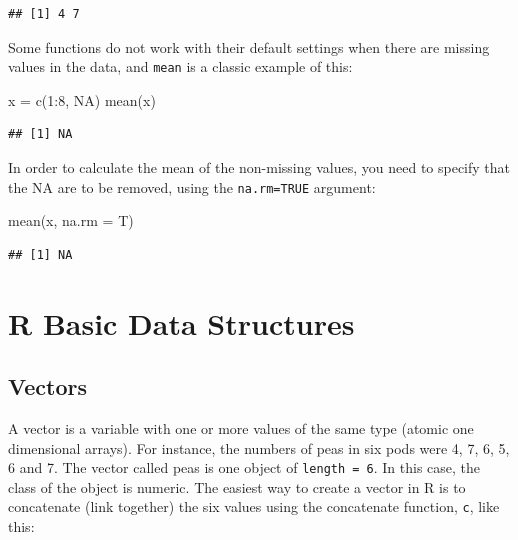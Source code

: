 \documentclass[
]{book}
\newenvironment{Shaded}{\begin{snugshade}}{\end{snugshade}}
\newcommand{\AttributeTok}[1]{\textcolor[rgb]{0.77,0.63,0.00}{#1}}
\newcommand{\ConstantTok}[1]{\textcolor[rgb]{0.00,0.00,0.00}{#1}}
\newcommand{\DecValTok}[1]{\textcolor[rgb]{0.00,0.00,0.81}{#1}}
\newcommand{\FunctionTok}[1]{\textcolor[rgb]{0.00,0.00,0.00}{#1}}
\newcommand{\NormalTok}[1]{#1}
\newcommand{\OtherTok}[1]{\textcolor[rgb]{0.56,0.35,0.01}{#1}}
\newcommand{\SpecialCharTok}[1]{\textcolor[rgb]{0.00,0.00,0.00}{#1}}
\begin{document}
\begin{verbatim}
## [1] 4 7
\end{verbatim}

Some functions do not work with their default settings when there are missing values in the data, and \texttt{mean} is a classic example of this:

\begin{Shaded}
\begin{Highlighting}[]
\NormalTok{x }\OtherTok{=} \FunctionTok{c}\NormalTok{(}\DecValTok{1}\SpecialCharTok{:}\DecValTok{8}\NormalTok{, }\ConstantTok{NA}\NormalTok{)}
\FunctionTok{mean}\NormalTok{(x)}
\end{Highlighting}
\end{Shaded}

\begin{verbatim}
## [1] NA
\end{verbatim}

In order to calculate the mean of the non-missing values, you need to specify that the NA are to be removed, using the \texttt{na.rm=TRUE} argument:

\begin{Shaded}
\begin{Highlighting}[]
\FunctionTok{mean}\NormalTok{(x, }\AttributeTok{na.rm =}\NormalTok{ T)}
\end{Highlighting}
\end{Shaded}

\begin{verbatim}
## [1] NA
\end{verbatim}

\hypertarget{r-basic-data-structures}{%
\section{R Basic Data Structures}\label{r-basic-data-structures}}

\hypertarget{vectors}{%
\subsection{Vectors}\label{vectors}}

A vector is a variable with one or more values of the same type (atomic one dimensional arrays). For instance, the numbers of peas in six pods were 4, 7, 6, 5, 6 and 7. The vector called peas is one object of \texttt{length\ =\ 6}. In this case, the class of the object is numeric. The easiest way to create a vector in R is to concatenate (link together) the six values using the concatenate function, \texttt{c}, like this:
\end{document}
